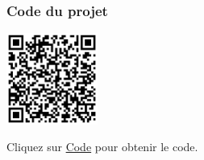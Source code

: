 \documentclass[a4paper,12pt]{report}
\begin{document}
\subsubsection{Code du projet}

\begin{minipage}{0.5\textwidth}
    \includegraphics[height=3cm]{Code TC306.png}
\end{minipage}%
\begin{minipage}{0.5\textwidth}
    Cliquez sur \href{https://github.com/DexterTaha/Controllino-PLC-Sample/blob/main/TC300/TC306_Automate_de_vides/TC306_Automate_de_vides.ino}{Code} pour obtenir le code.
\end{minipage}

\newpage
\end{document}
